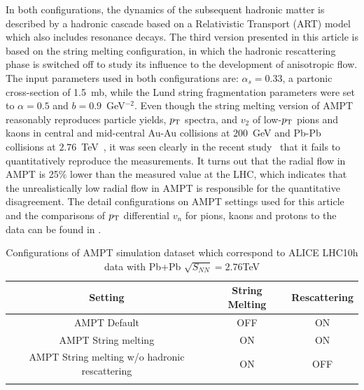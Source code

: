 In both configurations, the dynamics of the subsequent hadronic matter is described by a hadronic cascade based on a Relativistic Transport (ART) model~\cite{Li:2001xh} which also includes resonance decays.
The third version presented in this article is based on the string melting configuration, in which the hadronic rescattering phase is switched off to study its influence to the development of anisotropic flow.
The input parameters used in both configurations are: $\alpha_s = 0.33$, a partonic cross-section of 1.5~mb, while the Lund string fragmentation parameters were set to $\alpha = 0.5$ and $b = 0.9$~GeV$^{-2}$. 
Even though the string melting version of AMPT~\cite{Lin:2001zk,Lin:2004en} reasonably reproduces particle yields, $p_{\rm{T}}$ spectra, and $v_2$ of low-$p_{\rm{T}}$ pions and kaons in central and mid-central Au-Au collisions at $200$~GeV and Pb-Pb collisions at $2.76$~TeV~\cite{Lin:2014tya}, it was seen clearly in the recent study~\cite{Adam:2016nfo} that it fails to quantitatively reproduce the measurements. It turns out that the radial flow in AMPT is 25\% lower than the measured value at the LHC, which indicates that the unrealistically low radial flow in AMPT is responsible for the quantitative disagreement. The detail configurations on AMPT settings used for this article and the comparisons of $p_{\rm{T}}$ differential $v_{n}$ for pions, kaons and protons to the data can be found in \cite{Adam:2016nfo}.






\begin{table}[!h]
\begin{center}
\begin{tabular}{c|c|c}
\hline 
Setting		    & String Melting    & Rescattering  \\  \hline  \hline
AMPT Default  & OFF     & ON        \\ \hline
AMPT String melting  & ON      &  ON        \\ \hline 
AMPT String melting w/o hadronic rescattering  & ON      & OFF         \\ \hline
\label{Tab:AMPTConf}
\end{tabular}
\caption{Configurations of AMPT simulation dataset which correspond to ALICE LHC10h data with Pb+Pb $\sqrt{S_{NN}}=2.76$TeV}
\end{center}
\end{table}


